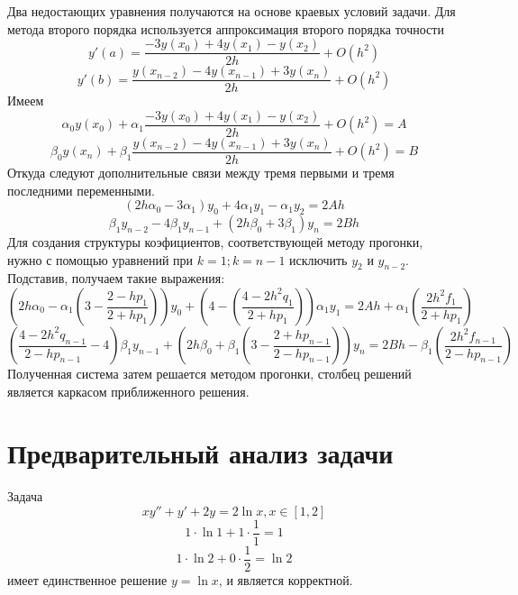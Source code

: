 \documentclass[a4paper]{article}
\begin{document}
Два недостающих уравнения получаются на основе краевых условий задачи. Для метода второго порядка используется
аппроксимация второго порядка точности \[
y'(a) = \frac{-3y(x_{0})+4y(x_{1})-y(x_{2})}{2h} + O(h^{2})
\]\[
  y'(b) = \frac{y(x_{n-2})-4y(x_{n-1})+3y(x_{n})}{2h} + O(h^2)
\]
Имеем \[
  \alpha_{0} y\left(x_{0}\right)+\alpha_{1} \frac{-3 y\left(x_{0}\right)+4 y\left(x_{1}\right)-y\left(x_{2}\right)}{2 h}+O\left(h^{2}\right)=A
\]
\[
  \beta_{0} y\left(x_{n}\right)+\beta_{1} \frac{y\left(x_{n-2}\right)-4 y\left(x_{n-1}\right)+3 y\left(x_{n}\right)}{2 h}+O\left(h^{2}\right)=B
\]
Откуда следуют дополнительные связи между тремя первыми и тремя последними переменными. \[
  \left(2 h \alpha_{0}-3 \alpha_{1}\right) y_{0}+4 \alpha_{1} y_{1}-\alpha_{1} y_{2}=2 A h
\]\[
  \beta_{1} y_{n-2}-4 \beta_{1} y_{n-1}+\left(2 h \beta_{0}+3 \beta_{1}\right) y_{n}=2 B h
\]
Для создания структуры коэфициентов, соответствующей методу прогонки, нужно с помощью уравнений при \(k=1; k=n-1\)
исключить \(y_{2}\) и \(y_{n-2}\). Подставив, получаем такие выражения:
\[
  \left(2h\alpha_{0} - \alpha_{1}\left(3 - \frac{2-hp_{1}}{2+hp_{1}}\right)\right)y_0 + \left(4 - \left(\frac{4-2h^2q_{1}}{2+hp_{1}}\right)\right)\alpha_{1}y_1 =
  2Ah + \alpha_{1}\left( \frac{2h^{2}f_{1}}{2+hp_{1}} \right)
\]
\[
  \left(\frac{4-2h^{2}q_{n-1}}{2-hp_{n-1}} - 4\right)\beta_{1}y_{n-1} + \left( 2h\beta_{0} +\beta_{1}\left(3 - \frac{2+hp_{n-1}}{2-hp_{n-1}}\right)\right)y_{n} =
  2Bh - \beta_{1}\left( \frac{2h^{2}f_{n-1}}{2-hp_{n-1}} \right)
\]
Полученная система затем решается методом прогонки, столбец решений является каркасом приближенного решения.

\section{Предварительный анализ задачи}\label{sec:S3}
Задача \[
  xy'' + y' +2y = 2\ln x, x \in [1,2]
\]\[
  1\cdot\ln 1 + 1\cdot \frac{1}{1} = 1
\]\[
  1 \cdot \ln 2 + 0 \cdot \frac{1}{2} = \ln 2
\]
имеет единственное решение \(y = \ln x\), и является корректной.
\end{document}
